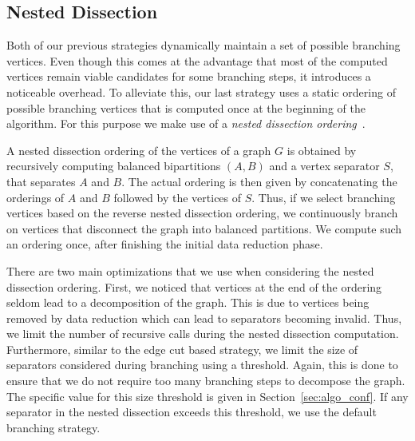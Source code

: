 \documentclass[a4paper,UKenglish,cleveref, autoref, thm-restate]{lipics-v2021}
\begin{document}
\subsection{Nested Dissection}
Both of our previous strategies dynamically maintain a set of possible branching vertices.
Even though this comes at the advantage that most of the computed vertices remain viable candidates for some branching steps, it introduces a noticeable overhead.
To alleviate this, our last strategy uses a static ordering of possible branching vertices that is computed once at the beginning of the algorithm.
For this purpose we make use of a \emph{nested dissection ordering}~\cite{george1973nested}.

A nested dissection ordering of the vertices of a graph $G$ is obtained by recursively computing balanced bipartitions $(A,B)$ and a vertex separator $S$, that separates $A$ and $B$.
The actual ordering is then given by concatenating the orderings of $A$ and $B$ followed by the vertices of $S$.
Thus, if we select branching vertices based on the reverse nested dissection
ordering, we continuously branch on vertices that disconnect the graph into balanced partitions. 
We compute such an ordering once, after finishing the initial data reduction phase.

There are two main optimizations that we use when considering the nested dissection ordering.
First, we noticed that vertices at the end of the ordering seldom lead to a decomposition of the graph. 
This is due to vertices being removed by data reduction which can lead to separators becoming invalid.
Thus, we limit the number of recursive calls during the nested dissection computation.
Furthermore, similar to the edge cut based strategy, we limit the size of
separators considered during branching using a threshold.
Again, this is done to ensure that we do not require too many branching steps to decompose the graph.
The specific value for this size threshold is given in Section~\ref{sec:algo_conf}.
If any separator in the nested dissection exceeds this threshold, we use the default branching strategy.
\end{document}
